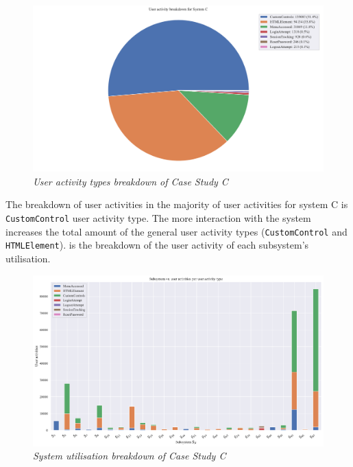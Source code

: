 \begin{figure}[!htb]
	\centering %
	\includegraphics[width=0.95\linewidth]{img/ch3/analysis/case_C_breakdown.pdf}
	\caption[User activity types breakdown of Case Study C]
	{\textit{User activity types breakdown of Case Study C}}\label{fig:ch3_caseCBreakdown}
\end{figure}

The breakdown of user activities in  the majority of user activities for system C is \texttt{CustomControl} user activity type. The more interaction with the system increases the total amount of the general user activity types (\texttt{CustomControl} and \texttt{HTMLElement}).  is the breakdown of the user activity of each subsystem's utilisation.

\begin{figure}[!htb]
	\centering %
	\includegraphics[width=0.95\linewidth]{img/ch3/analysis/case_C_subsystems_1.pdf}
	\caption[System utilisation breakdown of Case Study C]
	{\textit{System utilisation breakdown of Case Study C}}\label{fig:ch3_caseCAnalysis}
\end{figure} 

